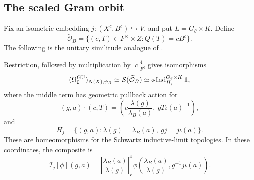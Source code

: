 \subsection{The scaled Gram orbit}\label{gu:jac:jacquet-section}
Fix an isometric embedding $j:(X^c,B^c)\hookrightarrow V$, and put
$L=G_\theta\times K$. Define
\begin{equation}\label{gu:jac:scaled-locus}
 \widetilde{\mathcal O}_B
 =\{(c,T)\in F^\times\times Z:Q(T)=cB^c\}.
\end{equation}
The following is the unitary similitude analogue of
\cite[Proposition~3.4]{ChenGan}.

\begin{proposition}\label{gu:jac:jacquet}
Restriction, followed by multiplication by $|c|_F^4$, gives isomorphisms
\begin{equation}\label{gu:jac:J}
 (\Omega_0^{\operatorname{GU}})_{N(X),\psi_B}
 \simeq\mathcal S(\widetilde{\mathcal O}_B)
 \simeq\operatorname{c\!-Ind}_{H_j}^{G_\theta\times K}\mathbf1,
\end{equation}
where the middle term has geometric pullback action for
\begin{equation}\label{gu:jac:orbit-action}
 (g,a)\cdot(c,T)
 =\left(c\frac{\lambda(g)}{\lambda_B(a)},\ gT\iota(a)^{-1}\right),
\end{equation}
and
\begin{equation}\label{gu:jac:stabilizer}
 H_j=\{(g,a):\lambda(g)=\lambda_B(a),\ gj=j\iota(a)\}.
\end{equation}
These are homeomorphisms for the Schwartz inductive-limit topologies.
In these coordinates, the composite is
\begin{equation}\label{gu:jac:intertwiner}
 \mathcal I_j[\phi](g,a)
 =\left|\frac{\lambda_B(a)}{\lambda(g)}\right|_F^4
 \phi\left(\frac{\lambda_B(a)}{\lambda(g)},g^{-1}j\iota(a)\right).
\end{equation}
\end{proposition}

